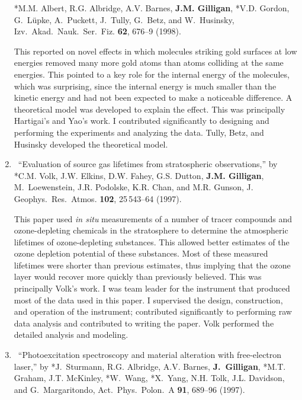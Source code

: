 \begin{enumerate}
	  *M.M. Albert, R.G. Albridge, A.V. Barnes, \textbf{J.M. Gilligan}, *V.D. Gordon,
	  G.~L\"upke, A.~Puckett, J.~Tully, G.~Betz, and W.~Husinsky, Izv.\ Akad.\ Nauk.\
	  Ser.\ Fiz. \textbf{62}, 676--9 (1998). 
	  \begin{credit}
	  This reported on novel effects in which molecules striking gold surfaces at low energies removed many more gold atoms than atoms colliding at the same energies. This pointed to a key role for the internal energy of the molecules, which was surprising, since the internal energy is much smaller than the kinetic energy and had not been expected to make a noticeable difference. A theoretical model was developed to explain the effect.
	  This was principally Hartigai's and Yao's work. I contributed significantly to designing and performing the experiments and analyzing the data. Tully, Betz, and Husinsky developed the theoretical model.
	  \end{credit}
%	
	\item
	\textdagger\ 
	\enquote{Evaluation of source gas lifetimes from stratospheric observations,}
	  by *C.M. Volk, J.W. Elkins, D.W. Fahey, G.S. Dutton, \textbf{J.M. Gilligan},
	  M.~Loewenstein, J.R. Podolske, K.R. Chan, and M.R. Gunson, J. Geophys.\
	  Res.\ Atmos. \textbf{102}, 25\,543--64 (1997). 
	  \begin{credit}
	  This paper used \emph{in situ\/} measurements of a number of tracer compounds and ozone-depleting chemicals in the stratosphere to determine the atmospheric lifetimes of ozone-depleting substances. This allowed better estimates of the ozone depletion potential of these substances. Most of these measured lifetimes were shorter than previous estimates, thus implying that the ozone layer would recover more quickly than previously believed. This was principally Volk's work. I was team leader for the instrument that produced most of the data used in this paper. I supervised the design, construction, and operation of the instrument; contributed significantly to performing raw data analysis and contributed to writing the paper. Volk performed the detailed analysis and modeling. 
	  \end{credit}
%	
	\item
	\textdagger\ 
	\enquote{Photoexcitation spectroscopy and material alteration with
	  free-electron laser,}  by *J.~Sturmann, R.G. Albridge, A.V. Barnes,
	  \textbf{J.~Gilligan}, *M.T. Graham, J.T. McKinley, *W.~Wang, *X.~Yang, N.H. Tolk,
	  J.L. Davidson, and G.~Margaritondo, Act.\ Phys.\ Polon.\ A \textbf{91},
	  689--96 (1997).
	  \begin{credit}

\end{credit}
\end{enumerate}
